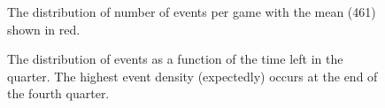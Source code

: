 \begin{figure}[h]
	
	\caption{The distribution of number of events per game with the mean (461) shown in red.}
\end{figure}

\begin{figure}[h]
	
	\caption{The distribution of events as a function of the time left in the quarter. The highest event density (expectedly) occurs at the end of the fourth quarter.}
\end{figure}

